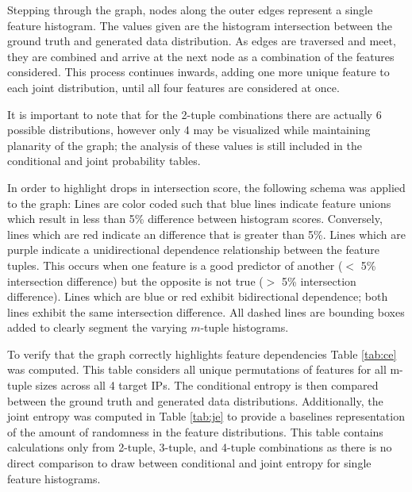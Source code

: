 Stepping through the graph, nodes along the outer edges represent a single feature histogram. The values given are the histogram intersection between the ground truth and generated data distribution. As edges are traversed and meet, they are combined and arrive at the next node as a combination of the features considered. This process continues inwards, adding one more unique feature to each joint distribution, until all four features are considered at once.

It is important to note that for the 2-tuple combinations there are actually 6 possible distributions, however only 4 may be visualized while maintaining planarity of the graph; the analysis of these values is still included in the conditional and joint probability tables.

In order to highlight drops in intersection score, the following schema was applied to the graph: Lines are color coded such that blue lines indicate feature unions which result in less than 5\% difference between histogram scores. Conversely, lines which are red indicate an difference that is greater than 5\%. Lines which are purple indicate a unidirectional dependence relationship between the feature tuples. This occurs when one feature is a good predictor of another ($<$ 5\% intersection difference) but the opposite is not true ($>$ 5\% intersection difference). Lines which are blue or red exhibit bidirectional dependence; both lines exhibit the same intersection difference. All dashed lines are bounding boxes added to clearly segment the varying $m$-tuple histograms.

To verify that the graph correctly highlights feature dependencies Table \ref{tab:ce} was computed. This table considers all unique permutations of features for all m-tuple sizes across all 4 target IPs. The conditional entropy is then compared between the ground truth and generated data distributions. Additionally, the joint entropy was computed in Table \ref{tab:je} to provide a baselines representation of the amount of randomness in the feature distributions. This table contains calculations only from 2-tuple, 3-tuple, and 4-tuple combinations as there is no direct comparison to draw between conditional and joint entropy for single feature histograms.




